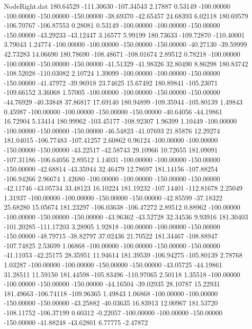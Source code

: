\begin{filecontents}{NodeRight.dat}
 180.64529 -111.30630 -107.34543     2.17887    0.53149 -100.00000 -100.00000 -150.00000 -150.00000  -38.69370  -42.65457   24.68393    6.02118
 180.69579 -106.70767 -106.87553     0.28081    0.53149 -100.00000 -100.00000 -150.00000 -150.00000  -43.29233  -43.12447    3.16577    5.99199
 180.73633 -109.72870 -110.40001     3.79043    1.24774 -100.00000 -100.00000 -150.00000 -150.00000  -40.27130  -39.59999   42.73283   14.06690
 180.78690 -108.48671 -108.01674     2.89512    0.78218 -100.00000 -100.00000 -150.00000 -150.00000  -41.51329  -41.98326   32.80490    8.86298
 180.83742 -108.52028 -110.03082     2.10724    1.39099 -100.00000 -100.00000 -150.00000 -150.00000  -41.47972  -39.96918   23.74625   15.67492
 180.89841 -105.23071 -109.66152     3.36068    1.57005 -100.00000 -100.00000 -150.00000 -150.00000  -44.76929  -40.33848   37.86817   17.69140
 180.94899 -109.35944 -105.80139     1.49843    0.45987 -100.00000 -100.00000 -150.00000 -150.00000  -40.64056  -44.19861   16.72904    5.13414
 180.99962 -103.45177 -108.92307     1.96399    1.10449 -100.00000 -100.00000 -150.00000 -150.00000  -46.54823  -41.07693   21.85876   12.29274
 181.04015 -106.77483 -107.41257     2.60862    0.96124 -100.00000 -100.00000 -150.00000 -150.00000  -43.22517  -42.58743   29.10966   10.72655
 181.09091 -107.31186 -106.64056     2.89512    1.14031 -100.00000 -100.00000 -150.00000 -150.00000  -42.68814  -43.35944   32.46479   12.78697
 181.14156 -107.88254 -106.94266     2.96674    1.42680 -100.00000 -100.00000 -150.00000 -150.00000  -42.11746  -43.05734   33.48123   16.10224
 181.19232 -107.14401 -112.81678     2.25049    1.31937 -100.00000 -100.00000 -150.00000 -150.00000  -42.85599  -37.18322   25.68280   15.05674
 181.23297 -106.03638 -106.47272     2.89512    0.88962 -100.00000 -100.00000 -150.00000 -150.00000  -43.96362  -43.52728   32.34536    9.93916
 181.30403 -101.20285 -111.17203     3.28905    1.92818 -100.00000 -100.00000 -150.00000 -150.00000  -48.79715  -38.82797   37.02436   21.70522
 181.34467 -108.88947 -107.74825     2.53699    1.06868 -100.00000 -100.00000 -150.00000 -150.00000  -41.11053  -42.25175   28.35951   11.94614
 181.39539 -106.94275 -105.80139     2.78768    1.03287 -100.00000 -100.00000 -150.00000 -150.00000  -43.05725  -44.19861   31.28511   11.59150
 181.44598 -105.83496 -110.97065     2.50118    1.35518 -100.00000 -100.00000 -150.00000 -150.00000  -44.16504  -39.02935   28.10787   15.22931
 181.49663 -106.74118 -109.96365     1.49843    1.06868 -100.00000 -100.00000 -150.00000 -150.00000  -43.25882  -40.03635   16.83913   12.00967
 181.53720 -108.11752 -106.37199     0.60312   -0.22057 -100.00000 -100.00000 -150.00000 -150.00000  -41.88248  -43.62801    6.77775   -2.47872

\end{filecontents}
